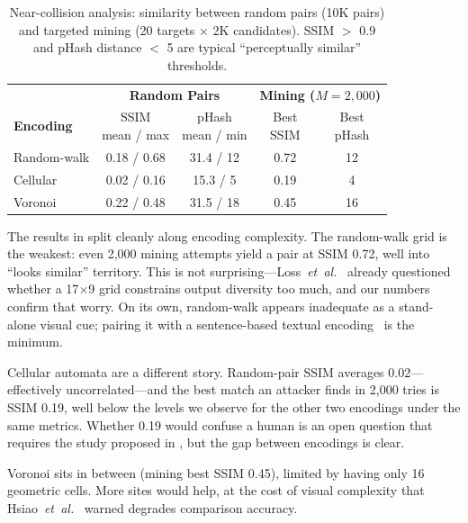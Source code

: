 \documentclass[conference,10pt]{IEEEtran}
\newcommand{\etal}{\textit{et~al.}}
\begin{document}
\begin{table}[t]
\centering
\caption{Near-collision analysis: similarity between random pairs (10K pairs) and targeted mining (20 targets $\times$ 2K candidates). SSIM $>$ 0.9 and pHash distance $<$ 5 are typical ``perceptually similar'' thresholds.}
\label{tab:collision}
\footnotesize
\renewcommand{\arraystretch}{1.15}
\begin{tabular}{@{}l c c c c@{}}
\toprule
& \multicolumn{2}{c}{\textbf{Random Pairs}} & \multicolumn{2}{c}{\textbf{Mining ($M{=}2{,}000$)}} \\
\cmidrule(lr){2-3} \cmidrule(lr){4-5}
\textbf{Encoding} & \makecell{SSIM\\mean / max} & \makecell{pHash\\mean / min} & \makecell{Best\\SSIM} & \makecell{Best\\pHash} \\
\midrule
Random-walk & 0.18 / 0.68 & 31.4 / 12 & 0.72 & 12 \\
Cellular & 0.02 / 0.16 & 15.3 / 5 & 0.19 & 4 \\
Voronoi & 0.22 / 0.48 & 31.5 / 18 & 0.45 & 16 \\
\bottomrule
\end{tabular}
\end{table}

The results in  split cleanly along encoding complexity.
The random-walk grid is the weakest: even 2,000 mining attempts yield a pair at SSIM 0.72, well into ``looks similar'' territory.
This is not surprising---Loss~\etal~\cite{loss2009drunken} already questioned whether a 17$\times$9 grid constrains output diversity too much, and our numbers confirm that worry.
On its own, random-walk appears inadequate as a stand-alone visual cue; pairing it with a sentence-based textual encoding~\cite{dechand2016empirical} is the minimum.

Cellular automata are a different story.
Random-pair SSIM averages 0.02---effectively uncorrelated---and the best match an attacker finds in 2,000 tries is SSIM 0.19, well below the levels we observe for the other two encodings under the same metrics.
Whether 0.19 would confuse a human is an open question that requires the study proposed in , but the gap between encodings is clear.

Voronoi sits in between (mining best SSIM 0.45), limited by having only 16 geometric cells.
More sites would help, at the cost of visual complexity that Hsiao~\etal~\cite{hsiao2009study} warned degrades comparison accuracy.
\end{document}
